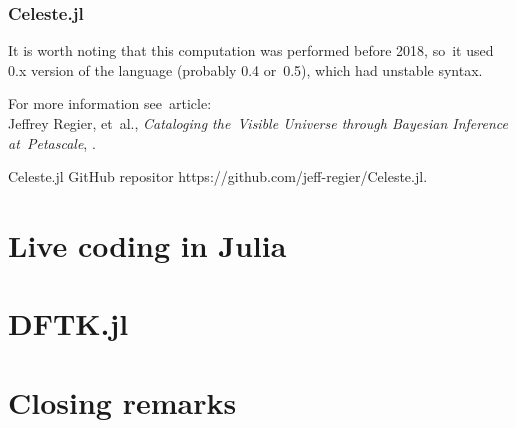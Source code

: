 \documentclass[10pt,t]{beamer}
\begin{document}
\begin{frame}
  \frametitle{Celeste.jl}


  It is worth noting that this computation was performed before 2018,
  so~it used 0.x version of the language (probably 0.4 or~0.5), which
  had unstable syntax.

  For more information see~article: \\
  Jeffrey Regier, et~al., \textit{Cataloging the~Visible Universe
    through Bayesian Inference at~Petascale},
  .

  Celeste.jl GitHub repositor
  {https://github.com/jeff-regier/Celeste.jl}.

\end{frame}










\section{Live coding in Julia}










\section{DFTK.jl}











\section{Closing remarks}
\end{document}

